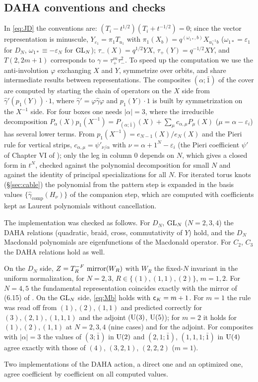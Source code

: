 \subsection{DAHA conventions and checks}\label{app:daha-conv}
In \eqref{eq:JD} the conventions are: $(T_i - t^{1/2})(T_i + t^{-1/2}) = 0$; since the vector representation is minuscule, $Y_{\varepsilon_1} = \pi_1 T_{u_1}$ with $\pi_1(X_b) = q^{(\omega_{1*}, b)}X_{u_1^{-1}b}$ ($\omega_{1*} = \varepsilon_1$ for $D_N$, $\omega_{1*} \equiv -\varepsilon_N$ for $\mathrm{GL}_N$); $\tau_-(X) = q^{1/2}YX$, $\tau_+(Y) = q^{-1/2}XY$, and $T(2,2m+1)$ corresponds to $\gamma = \tau_+^m\tau_-^2$. To speed up the computation we use the anti-involution $\varphi$ exchanging $X$ and $Y$, symmetrize over orbits, and share intermediate results between representations. The composites $(\alpha;\bar1)$ of the cover are computed by starting the chain of operators on the $X$ side from $\hat\gamma'(p_1(Y))\cdot 1$, where $\hat\gamma' = \varphi\hat\gamma\varphi$ and $p_1(Y)\cdot 1$ is built by symmetrization on the $X^{-1}$ side. For four boxes one needs $|\alpha| = 3$, where the irreducible decomposition $P_\alpha(X)p_1(X^{-1}) = P_{(\alpha;\bar1)}(X) + \sum_\mu c_{\alpha,\mu}P_\mu(X)$ ($\mu = \alpha - \varepsilon_i$) has several lower terms. From $p_1(X^{-1}) = e_{N-1}(X)/e_N(X)$ and the Pieri rule for vertical strips, $c_{\alpha,\mu} = \psi'_{\nu/\alpha}$ with $\nu = \alpha + 1^N - \varepsilon_i$ (the Pieri coefficient $\psi'$ of Chapter VI of \cite{Macdonald95}); only the leg in column $0$ depends on $N$, which gives a closed form in $t^N$, checked against the polynomial decomposition for small $N$ and against the identity of principal specializations for all $N$. For iterated torus knots (\S\ref{sec:cable}) the polynomial from the pattern step is expanded in the basis values $\{\hat\gamma_{\mathrm{comp}}(H_\nu)\}$ of the companion step, which are computed with coefficients kept as Laurent polynomials without cancellation.
\begin{result}[checks]\label{cr:daha}
The implementation was checked as follows. For $D_N$, $\mathrm{GL}_N$ ($N = 2, 3, 4$) the DAHA relations (quadratic, braid, cross, commutativity of $Y$) hold, and the $D_N$ Macdonald polynomials are eigenfunctions of the Macdonald operator. For $C_2$, $C_3$ the DAHA relations hold as well.

On the $D_N$ side, $Z = T_R^{-F}\,\operatorname{mirror}(W_R)$ with $W_R$ the fixed-$N$ invariant in the uniform normalization, for $N = 2, 3$, $R \in \{(1), (1,1), (2)\}$, $m = 1, 2$. For $N = 4, 5$ the fundamental representation coincides exactly with the mirror of (6.15) of \cite{AgSc12}.
On the $\mathrm{GL}_N$ side, \eqref{eq:Mb} holds with $\mathsf{c}_K = m+1$. For $m = 1$ the rule was read off from $(1), (2), (1,1)$ and predicted correctly for $(3), (2,1), (1,1,1)$ and the adjoint ($\mathrm{U}(3)$, $\mathrm{U}(5)$); for $m = 2$ it holds for $(1), (2), (1,1)$ at $N = 2, 3, 4$ (nine cases) and for the adjoint. For composites with $|\alpha| = 3$ the values of $(3;\bar1)$ in $\mathrm{U}(2)$ and $(2,1;\bar1)$, $(1,1,1;\bar1)$ in $\mathrm{U}(4)$ agree exactly with those of $(4)$, $(3,2,1)$, $(2,2,2)$ ($m = 1$).

Two implementations of the DAHA action, a direct one and an optimized one, agree coefficient by coefficient on all computed values.
\end{result}
